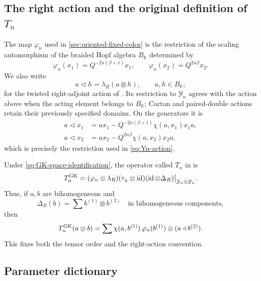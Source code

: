 \documentclass[11pt,a4paper]{article}
\newcommand{\hK}{\mathbb K}
\newcommand{\ot}{\otimes}
\newcommand{\tri}{\mathbin{\triangleleft}}
\newcommand{\id}{\operatorname{id}}
\theoremstyle{definition}
\theoremstyle{remark}
\begin{document}
\subsection{The right action and the original definition of
\texorpdfstring{\(T_n\)}{Tn}}
\label{app:GK-action}

The map \(\varphi_n\) used in \cref{sec:oriented-fixed-color} is the restriction of the
scaling automorphism of the braided Hopf algebra \(B_{\hK}\) determined by
\begin{equation}\label{eq:GK-scaling}
 \varphi_n(x_1)=Q^{-2n(\beta+1)}x_1,\qquad
 \varphi_n(x_2)=Q^{2n\beta}x_2.
\end{equation}
We also write
\[
 a\tri h=\lambda_R(a\ot h),\qquad a,h\in B_{\hK},
\]
for the twisted right-adjoint action of \cite[Theorem~3.5]{GK}.
Its restriction to \(\mathcal Y_n\) agrees with the action above
when the acting element belongs to \(B_{\hK}\); Cartan and paired-double
actions retain their previously specified domains.
On the generators it is
\begin{equation}\label{eq:GK-right-action}
\begin{aligned}
 a\tri x_1&=ax_1-Q^{-2n(\beta+1)}\chi(a,x_1)x_1a,\\
 a\tri x_2&=ax_2-Q^{2n\beta}\chi(a,x_2)x_2a,
\end{aligned}
\end{equation}
which is precisely the restriction used in \eqref{eq:Yn-action}.

Under \eqref{eq:GK-space-identification}, the operator called \(T_n\) in
\cite[Theorem~3.6 and Definition~7.5]{GK} is
\begin{equation}\label{eq:GK-T-definition}
 T_n^{\rm GK}
 =
 (\varphi_n\ot\lambda_R)
 (\tau_\chi\ot\id)
 (\id\ot\Delta_B)
 \big|_{\mathcal Y_n\ot\mathcal Y_n}.
\end{equation}
Thus, if \(a,b\) are bihomogeneous and
\[
 \Delta_B(b)=\sum b^{(1)}\ot b^{(2)}
 \quad\text{in bihomogeneous components},
\]
then
\begin{equation}\label{eq:GK-T-Sweedler}
 T_n^{\rm GK}(a\ot b)
 =\sum \chi(a,b^{(1)})\,
 \varphi_n(b^{(1)})\ot(a\tri b^{(2)}).
\end{equation}
This fixes both the tensor order and the right-action convention.

\subsection{Parameter dictionary}
\end{document}
